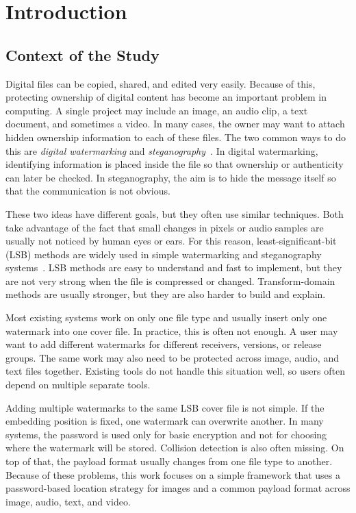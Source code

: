 \chapter{Introduction}

\section{Context of the Study}

Digital files can be copied, shared, and edited very easily. Because of this, protecting ownership of digital content has become an important problem in computing. A single project may include an image, an audio clip, a text document, and sometimes a video. In many cases, the owner may want to attach hidden ownership information to each of these files. The two common ways to do this are \emph{digital watermarking} and \emph{steganography}~\cite{cox2007digital,petitcolas1999information,johnson1998exploring}. In digital watermarking, identifying information is placed inside the file so that ownership or authenticity can later be checked. In steganography, the aim is to hide the message itself so that the communication is not obvious.

These two ideas have different goals, but they often use similar techniques. Both take advantage of the fact that small changes in pixels or audio samples are usually not noticed by human eyes or ears. For this reason, least-significant-bit (LSB) methods are widely used in simple watermarking and steganography systems~\cite{chan2004hiding,bender1996techniques,morkel2005overview}. LSB methods are easy to understand and fast to implement, but they are not very strong when the file is compressed or changed. Transform-domain methods are usually stronger, but they are also harder to build and explain.

Most existing systems work on only one file type and usually insert only one watermark into one cover file. In practice, this is often not enough. A user may want to add different watermarks for different receivers, versions, or release groups. The same work may also need to be protected across image, audio, and text files together. Existing tools do not handle this situation well, so users often depend on multiple separate tools.

Adding multiple watermarks to the same LSB cover file is not simple. If the embedding position is fixed, one watermark can overwrite another. In many systems, the password is used only for basic encryption and not for choosing where the watermark will be stored. Collision detection is also often missing. On top of that, the payload format usually changes from one file type to another. Because of these problems, this work focuses on a simple framework that uses a password-based location strategy for images and a common payload format across image, audio, text, and video.

